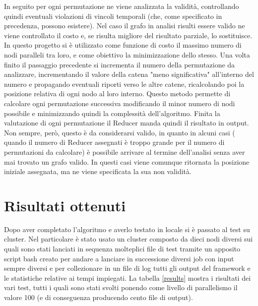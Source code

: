 \documentclass[]{IEEEtran}
\begin{document}
In seguito per ogni permutazione ne viene analizzata la validità, controllando quindi eventuali violazioni di vincoli temporali (che, come specificato in precedenza, possono esistere). Nel caso il grafo in analisi risulti essere valido ne viene controllato il costo e, se risulta migliore del risultato parziale, lo sostituisce. 
In questo progetto si è utilizzato come funzione di costo il massimo numero di nodi paralleli tra loro, e come obiettivo la minimizzazione dello stesso.
Una volta finito il passaggio precedente si incrementa il numero della permutazione da analizzare, incrementando il valore della catena "meno significativa" all'interno del numero e propagando eventuali riporti verso le altre catene, ricalcolando poi la posizione relativa di ogni nodo al loro interno.
Questo metodo permette di calcolare ogni permutazione successiva modificando il minor numero di nodi possibile e minimizzando quindi la complessità dell'algoritmo.
Finita la valutazione di ogni permutazione il Reducer manda quindi il risultato in output.
Non sempre, però, questo è da considerarsi valido, in quanto in alcuni casi ( quando il numero di Reducer assegnati è troppo grande per il numero di permutazioni da calcolare) è possibile arrivare al termine dell'analisi senza aver mai trovato un grafo valido. In questi casi viene comunque ritornata la posizione iniziale assegnata, ma ne viene specificata la sua non validità.

\section{Risultati ottenuti}
Dopo aver completato l'algoritmo e averlo testato in locale si è passato al test su cluster. 
Nel particolare è stato usato un cluster composto da dieci nodi diversi sui quali sono stati lanciati in sequenza molteplici file di test tramite un apposito script bash creato per andare a lanciare in successione diversi job con input sempre diversi e per collezionare in un file di log tutti gli output del framework e le statistiche relative ai tempi impiegati. La tabella \ref{results} mostra i risultati dei vari test, tutti i quali sono stati svolti ponendo come livello di parallelismo il valore 100 (e di conseguenza producendo cento file di output).
\end{document}
